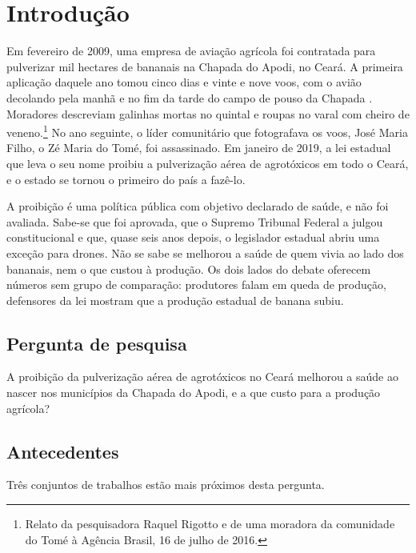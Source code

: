 \chapter{Introdução}
\label{sec:introducao}


Em fevereiro de 2009, uma empresa de aviação agrícola foi contratada para
pulverizar mil hectares de bananais na Chapada do Apodi, no Ceará. A primeira
aplicação daquele ano tomou cinco dias e vinte e nove voos, com o avião
decolando pela manhã e no fim da tarde do campo de pouso da Chapada
\cite[p.~171--173]{marinho2011dimensao}. Moradores descreviam galinhas mortas no
quintal e roupas no varal com cheiro de veneno.\footnote{Relato da pesquisadora
Raquel Rigotto e de uma moradora da comunidade do Tomé à Agência Brasil, 16 de
julho de 2016.} No ano seguinte, o líder comunitário que fotografava os voos,
José Maria Filho, o Zé Maria do Tomé, foi assassinado. Em janeiro de 2019, a lei
estadual que leva o seu nome proibiu a pulverização aérea de agrotóxicos em
todo o Ceará, e o estado se tornou o primeiro do país a fazê-lo.

A proibição é uma política pública com objetivo declarado de saúde, e não foi
avaliada. Sabe-se que foi aprovada, que o Supremo Tribunal Federal a julgou
constitucional e que, quase seis anos depois, o legislador estadual abriu uma
exceção para drones. Não se sabe se melhorou a saúde de quem vivia ao lado dos
bananais, nem o que custou à produção. Os dois lados do debate oferecem números
sem grupo de comparação: produtores falam em queda de produção, defensores da
lei mostram que a produção estadual de banana subiu.

\section{Pergunta de pesquisa}

A proibição da pulverização aérea de agrotóxicos no Ceará melhorou a saúde ao
nascer nos municípios da Chapada do Apodi, e a que custo para a produção
agrícola?

\section{Antecedentes}

Três conjuntos de trabalhos estão mais próximos desta pergunta.

